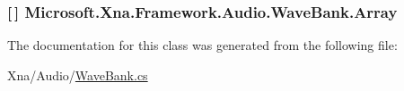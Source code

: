 \subsubsection[{Array}]{ \mbox{[}$\,$\mbox{]} Microsoft.\+Xna.\+Framework.\+Audio.\+Wave\+Bank.\+Array\hspace{0.3cm}{\ttfamily [static]}}\label{class_microsoft_1_1_xna_1_1_framework_1_1_audio_1_1_wave_bank_a05d5603d4c5bccdafcf9b9cc9633ec57}


The documentation for this class was generated from the following file\+:\begin{DoxyCompactItemize}
\item 
Xna/\+Audio/\hyperlink{_wave_bank_8cs}{Wave\+Bank.\+cs}\end{DoxyCompactItemize}
